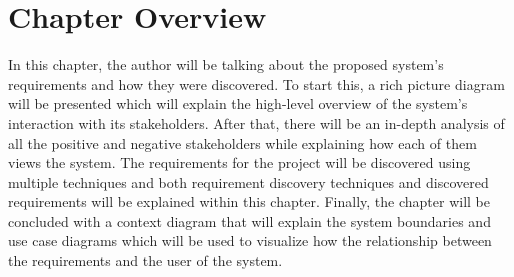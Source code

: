 \section{Chapter Overview}

In this chapter, the author will be talking about the proposed system's requirements and how they were discovered. To start this, a rich picture diagram will be presented which will explain the high-level overview of the system's interaction with its stakeholders. After that, there will be an in-depth analysis of all the positive and negative stakeholders while explaining how each of them views the system. The requirements for the project will be discovered using multiple techniques and both requirement discovery techniques and discovered requirements will be explained within this chapter. Finally, the chapter will be concluded with a context diagram that will explain the system boundaries and use case diagrams which will be used to visualize how the relationship between the requirements and the user of the system. 